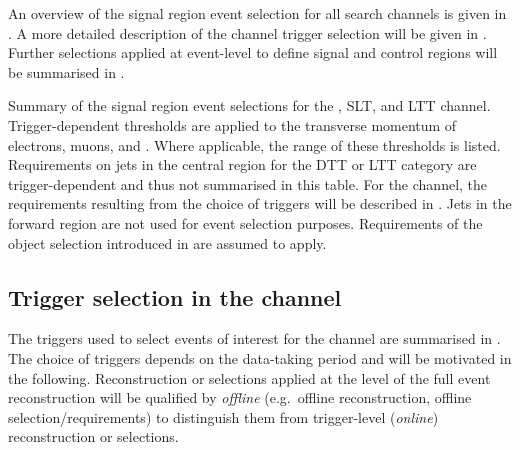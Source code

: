 An overview of the signal region event selection for all search
channels is given in . A more detailed
description of the \hadhad channel trigger selection will be given in
. Further selections applied at
event-level to define signal and control regions will be summarised in
.

\begin{table}[htbp]
  \centering

  \caption{Summary of the signal region event selections for the
    \hadhad, \lephad SLT, and \lephad LTT channel. Trigger-dependent
    thresholds are applied to the transverse momentum of electrons,
    muons, and \tauhadvis. Where applicable, the range of these
    thresholds is listed.  Requirements on jets in the central region
    for the DTT or LTT category are trigger-dependent and thus not
    summarised in this table. For the \hadhad channel, the
    requirements resulting from the choice of triggers will be
    described in . Jets in the
    forward region are not used for event selection
    purposes. Requirements of the object selection introduced in
     are assumed to apply.}%
  \label{tab:event_selection}

  \resizebox{\textwidth}{!}{
    
  }
\end{table}


\subsection{Trigger selection in the \hadhad channel}%
\label{sec:trigger}%
\label{sec:hadhad_trigger_selection}

The triggers used to select events of interest for the \hadhad channel
are summarised in . The choice of triggers
depends on the data-taking period and will be motivated in the
following. Reconstruction or selections applied at the level of the
full event reconstruction will be qualified by \emph{offline} (e.g.\
offline reconstruction, offline selection/requirements) to distinguish
them from trigger-level (\emph{online}) reconstruction or selections.

